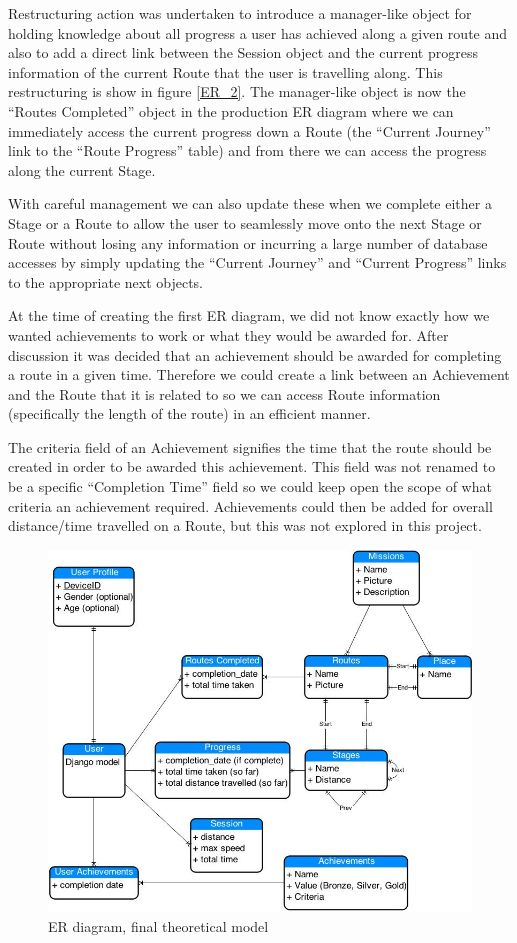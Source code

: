 Restructuring action was undertaken to introduce a manager-like object
for holding knowledge about all progress a user has achieved along a
given route and also to add a direct link between the Session object
and the current progress information of the current Route that the
user is travelling along. This restructuring is show in figure
\ref{ER_2}. The manager-like object is now the ``Routes Completed''
object in the production ER diagram where we can immediately access
the current progress down a Route (the ``Current Journey'' link to the
``Route Progress'' table) and from there we can access the progress
along the current Stage. 

With careful management we can also update these when we complete
either a Stage or a Route to allow the user to seamlessly move onto
the next Stage or Route without losing any information or incurring a
large number of database accesses by simply updating the ``Current
Journey'' and ``Current Progress'' links to the appropriate next
objects. 

At the time of creating the first ER diagram, we did not know exactly
how we wanted achievements to work or what they would be awarded
for. After discussion it was decided that an achievement should be
awarded for completing a route in a given time. Therefore we could
create a link between an Achievement and the Route that it is related
to so we can access Route information (specifically the length of the
route) in an efficient manner. 

The criteria field of an Achievement signifies the time that the route
should be created in order to be awarded this achievement. This field
was not renamed to be a specific ``Completion Time'' field so we could
keep open the scope of what criteria an achievement
required. Achievements could then be added for overall distance/time
travelled on a Route, but this was not explored in this project.

\begin{figure}[p]
  \centering
  \includegraphics[width=\textwidth]{images/ER.jpg}
  \caption{ER diagram, final theoretical model}
  \label{ER_1}
\end{figure}

